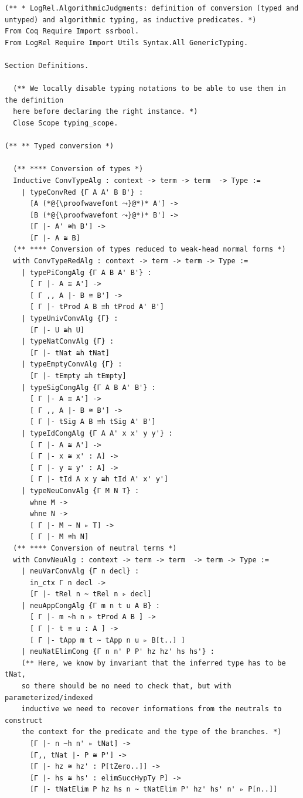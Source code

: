 \begin{lstlisting}
(** * LogRel.AlgorithmicJudgments: definition of conversion (typed and untyped) and algorithmic typing, as inductive predicates. *)
From Coq Require Import ssrbool.
From LogRel Require Import Utils Syntax.All GenericTyping.

Section Definitions.

  (** We locally disable typing notations to be able to use them in the definition
  here before declaring the right instance. *)
  Close Scope typing_scope.

(** ** Typed conversion *)

  (** **** Conversion of types *)
  Inductive ConvTypeAlg : context -> term -> term  -> Type :=
    | typeConvRed {Γ A A' B B'} :
      [A (*@{\proofwavefont ⤳}@*)* A'] ->
      [B (*@{\proofwavefont ⤳}@*)* B'] ->
      [Γ |- A' ≅h B'] ->
      [Γ |- A ≅ B]
  (** **** Conversion of types reduced to weak-head normal forms *)
  with ConvTypeRedAlg : context -> term -> term -> Type :=
    | typePiCongAlg {Γ A B A' B'} :
      [ Γ |- A ≅ A'] ->
      [ Γ ,, A |- B ≅ B'] ->
      [ Γ |- tProd A B ≅h tProd A' B']
    | typeUnivConvAlg {Γ} :
      [Γ |- U ≅h U]
    | typeNatConvAlg {Γ} :
      [Γ |- tNat ≅h tNat]
    | typeEmptyConvAlg {Γ} :
      [Γ |- tEmpty ≅h tEmpty]
    | typeSigCongAlg {Γ A B A' B'} :
      [ Γ |- A ≅ A'] ->
      [ Γ ,, A |- B ≅ B'] ->
      [ Γ |- tSig A B ≅h tSig A' B']
    | typeIdCongAlg {Γ A A' x x' y y'} :
      [ Γ |- A ≅ A'] ->
      [ Γ |- x ≅ x' : A] ->
      [ Γ |- y ≅ y' : A] ->
      [ Γ |- tId A x y ≅h tId A' x' y']
    | typeNeuConvAlg {Γ M N T} :
      whne M ->
      whne N ->
      [ Γ |- M ~ N ▹ T] -> 
      [ Γ |- M ≅h N]
  (** **** Conversion of neutral terms *)
  with ConvNeuAlg : context -> term -> term  -> term -> Type :=
    | neuVarConvAlg {Γ n decl} :
      in_ctx Γ n decl ->
      [Γ |- tRel n ~ tRel n ▹ decl]
    | neuAppCongAlg {Γ m n t u A B} :
      [ Γ |- m ~h n ▹ tProd A B ] ->
      [ Γ |- t ≅ u : A ] ->
      [ Γ |- tApp m t ~ tApp n u ▹ B[t..] ]
    | neuNatElimCong {Γ n n' P P' hz hz' hs hs'} :
    (** Here, we know by invariant that the inferred type has to be tNat,
    so there should be no need to check that, but with parameterized/indexed
    inductive we need to recover informations from the neutrals to construct
    the context for the predicate and the type of the branches. *)
      [Γ |- n ~h n' ▹ tNat] ->
      [Γ,, tNat |- P ≅ P'] ->
      [Γ |- hz ≅ hz' : P[tZero..]] ->
      [Γ |- hs ≅ hs' : elimSuccHypTy P] ->
      [Γ |- tNatElim P hz hs n ~ tNatElim P' hz' hs' n' ▹ P[n..]]

\end{lstlisting}
